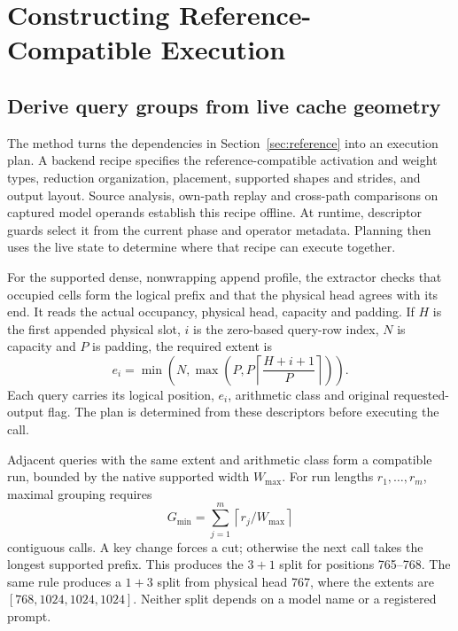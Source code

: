\section{Constructing Reference-Compatible Execution}
\label{sec:method}
\subsection{Derive query groups from live cache geometry}
The method turns the dependencies in Section~\ref{sec:reference} into an execution plan. A backend recipe specifies the reference-compatible activation and weight types, reduction organization, placement, supported shapes and strides, and output layout. Source analysis, own-path replay and cross-path comparisons on captured model operands establish this recipe offline. At runtime, descriptor guards select it from the current phase and operator metadata. Planning then uses the live state to determine where that recipe can execute together.

For the supported dense, nonwrapping append profile, the extractor checks that occupied cells form the logical prefix and that the physical head agrees with its end. It reads the actual occupancy, physical head, capacity and padding. If $H$ is the first appended physical slot, $i$ is the zero-based query-row index, $N$ is capacity and $P$ is padding, the required extent is
\begin{equation}
 e_i=\min\!\left(N,\max\!\left(P,P\left\lceil\frac{H+i+1}{P}\right\rceil\right)\right).
 \label{eq:extent}
\end{equation}
Each query carries its logical position, $e_i$, arithmetic class and original requested-output flag. The plan is determined from these descriptors before executing the call.

Adjacent queries with the same extent and arithmetic class form a compatible run, bounded by the native supported width $W_{\max}$. For run lengths $r_1,\ldots,r_m$, maximal grouping requires
\begin{equation}
 G_{\min}=\sum_{j=1}^{m}\left\lceil r_j/W_{\max}\right\rceil
 \label{eq:groups}
\end{equation}
contiguous calls. A key change forces a cut; otherwise the next call takes the longest supported prefix. This produces the $3+1$ split for positions 765--768. The same rule produces a $1+3$ split from physical head 767, where the extents are $[768,1024,1024,1024]$. Neither split depends on a model name or a registered prompt.

